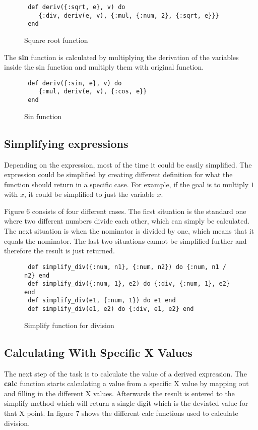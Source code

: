 \documentclass[a4paper,11pt]{article}
\begin{document}
\begin{figure}[!ht]
\begin{verbatim}
 def deriv({:sqrt, e}, v) do
    {:div, deriv(e, v), {:mul, {:num, 2}, {:sqrt, e}}}
 end
\end{verbatim}
\caption{Square root function}
\label{Figure:4}
\end{figure}

The \textbf{sin} function is calculated by multiplying the derivation of the variables inside the sin function and multiply them with original function.

\begin{figure}[!ht]
\begin{verbatim}
 def deriv({:sin, e}, v) do
    {:mul, deriv(e, v), {:cos, e}}
 end
\end{verbatim}
\caption{Sin function}
\label{Figure:5}
\end{figure}

\subsection*{Simplifying expressions}
Depending on the expression, most of the time it could be easily simplified. The expression could be simplified by creating different definition for what the function should return in a specific case. For example, if the goal is to multiply $ 1 $ with $ x $, it could be simplified to just the variable $ x $.

Figure 6 consists of four different cases. The first situation is the standard one where two different numbers divide each other, which can simply be calculated. The next situation is when the nominator is divided by one, which means that it equals the nominator. The last two situations cannot be simplified further and therefore the result is just returned.

\begin{figure}[!ht]
\begin{verbatim}
 def simplify_div({:num, n1}, {:num, n2}) do {:num, n1 / n2} end
 def simplify_div({:num, 1}, e2) do {:div, {:num, 1}, e2} end
 def simplify_div(e1, {:num, 1}) do e1 end
 def simplify_div(e1, e2) do {:div, e1, e2} end
\end{verbatim}
\caption{Simplify function for division}
\label{Figure:6}
\end{figure}


\subsection*{Calculating With Specific X Values}
The next step of the task is to calculate the value of a derived expression. The \textbf{calc} function starts calculating a value from a specific X value by mapping out and filling in the different X values. Afterwards the result is entered to the simplify method which will return a single digit which is the deviated value for that X point. In figure 7 shows the different calc functions used to calculate division.
\end{document}
